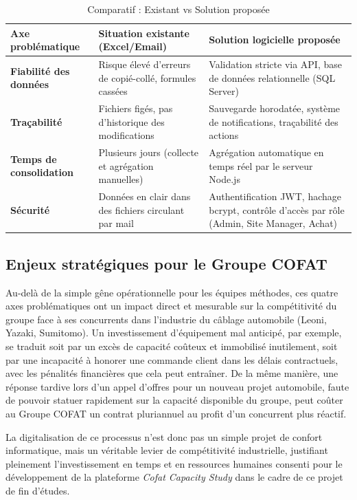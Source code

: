 \begin{table}[h]
\centering
\begin{tabular}{|p{4cm}|p{5cm}|p{6cm}|}
\hline
\textbf{Axe problématique} & \textbf{Situation existante (Excel/Email)} & \textbf{Solution logicielle proposée} \\ \hline
\textbf{Fiabilité des données} & Risque élevé d'erreurs de copié-collé, formules cassées & Validation stricte via API, base de données relationnelle (SQL Server) \\ \hline
\textbf{Traçabilité} & Fichiers figés, pas d'historique des modifications & Sauvegarde horodatée, système de notifications, traçabilité des actions \\ \hline
\textbf{Temps de consolidation} & Plusieurs jours (collecte et agrégation manuelles) & Agrégation automatique en temps réel par le serveur Node.js \\ \hline
\textbf{Sécurité} & Données en clair dans des fichiers circulant par mail & Authentification JWT, hachage bcrypt, contrôle d'accès par rôle (Admin, Site Manager, Achat) \\ \hline
\end{tabular}
\caption{Comparatif : Existant vs Solution proposée}
\label{tab:comparatif_existant}
\end{table}

\subsection{Enjeux stratégiques pour le Groupe COFAT}
Au-delà de la simple gêne opérationnelle pour les équipes méthodes, ces quatre axes problématiques ont un impact direct et mesurable sur la compétitivité du groupe face à ses concurrents dans l'industrie du câblage automobile (Leoni, Yazaki, Sumitomo). Un investissement d'équipement mal anticipé, par exemple, se traduit soit par un excès de capacité coûteux et immobilisé inutilement, soit par une incapacité à honorer une commande client dans les délais contractuels, avec les pénalités financières que cela peut entraîner. De la même manière, une réponse tardive lors d'un appel d'offres pour un nouveau projet automobile, faute de pouvoir statuer rapidement sur la capacité disponible du groupe, peut coûter au Groupe COFAT un contrat pluriannuel au profit d'un concurrent plus réactif.

La digitalisation de ce processus n'est donc pas un simple projet de confort informatique, mais un véritable levier de compétitivité industrielle, justifiant pleinement l'investissement en temps et en ressources humaines consenti pour le développement de la plateforme \textit{Cofat Capacity Study} dans le cadre de ce projet de fin d'études.



